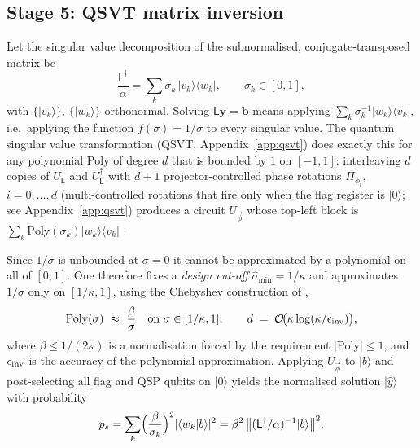 \documentclass[11pt,a4paper]{article}
\theoremstyle{plain}
\theoremstyle{definition}
\theoremstyle{remark}
\newcommand{\Oh}{\mathcal{O}}
\newcommand{\ket}[1]{\lvert #1 \rangle}
\newcommand{\bra}[1]{\langle #1 \rvert}
\newcommand{\braket}[2]{\langle #1 \vert #2 \rangle}
\newcommand{\abs}[1]{\lvert #1 \rvert}
\newcommand{\yvec}{\bm{y}}
\newcommand{\Lmat}{\mathsf{L}}
\begin{document}
\subsection{Stage 5: QSVT matrix inversion}
\label{sec:qsvt}

Let the singular value decomposition of the subnormalised, conjugate-transposed
matrix be
\begin{equation}
\frac{\Lmat^\dagger}{\alpha}=\sum_{k}\sigma_k\,\ket{v_k}\!\bra{w_k},
\qquad \sigma_k\in[0,1],
\end{equation}
with $\{\ket{v_k}\}$, $\{\ket{w_k}\}$ orthonormal.  Solving
$\Lmat\yvec=\bm b$ means applying $\sum_k\sigma_k^{-1}\ket{w_k}\!\bra{v_k}$,
i.e.\ applying the function $f(\sigma)=1/\sigma$ to every singular value.
The quantum singular value transformation (QSVT, Appendix~\ref{app:qsvt}) does
exactly this for any polynomial $\mathrm{Poly}$ of degree $d$ that is bounded by
$1$ on $[-1,1]$: interleaving $d$ copies of $U_\Lmat$ and $U_\Lmat^\dagger$ with
$d+1$ projector-controlled phase rotations $\Pi_{\phi_i}$, $i=0,\dots,d$ (multi-controlled rotations that fire only when the flag register is $\ket{0}$; see Appendix~\ref{app:qsvt}) produces a
circuit $U_{\vec\phi}$ whose top-left block is
$\sum_k\mathrm{Poly}(\sigma_k)\ket{w_k}\!\bra{v_k}$
\cite[Theorem~2]{Setty2026}.

Since $1/\sigma$ is unbounded at $\sigma=0$ it cannot be approximated by a
polynomial on all of $[0,1]$.  One therefore fixes a \emph{design cut-off}
$\hat\sigma_{\min}=1/\kappa$ and approximates $1/\sigma$ only on
$[1/\kappa,1]$, using the Chebyshev construction of
\cite[Appendix~B]{Setty2026},
\begin{equation}
\mathrm{Poly}(\sigma)\ \approx\ \frac{\beta}{\sigma}
\quad\text{on }\sigma\in[1/\kappa,1],
\qquad
d\;=\;\Oh\!\bigl(\kappa\log(\kappa/\epsilon_{\rm inv})\bigr),
\label{eq:degree}
\end{equation}
where $\beta\le 1/(2\kappa)$ is a normalisation forced by the requirement
$\abs{\mathrm{Poly}}\le1$, and $\epsilon_{\rm inv}$ is the accuracy of the
polynomial approximation.  Applying $U_{\vec\phi}$ to $\ket{b}$ and
post-selecting all flag and QSP qubits on $\ket{0}$ yields the normalised
solution $\ket{\hat y}$ with probability \cite[Eq.~(7)]{Setty2026}
\begin{equation}
p_s=\sum_k\Bigl(\frac{\beta}{\sigma_k}\Bigr)^{2}\abs{\braket{w_k}{b}}^2
=\beta^{2}\,\bigl\lVert(\Lmat^\dagger/\alpha)^{-1}\ket{b}\bigr\rVert^{2}.
\label{eq:ps}
\end{equation}
\end{document}
